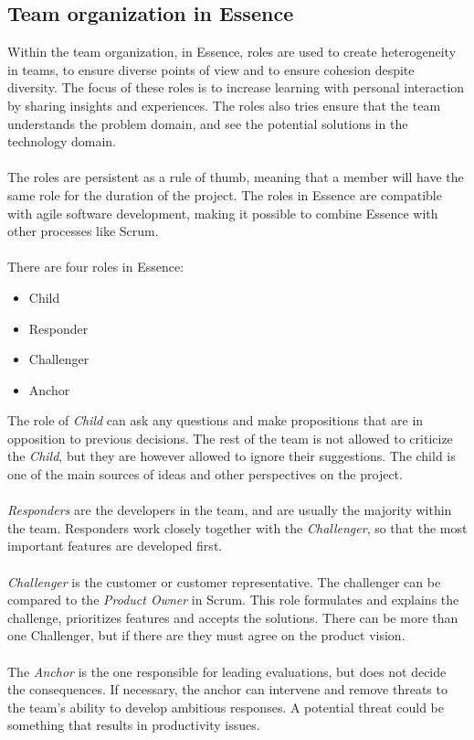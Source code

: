 \subsection{Team organization in Essence}
\label{sec:team-organization}
Within the team organization, in Essence, roles are used to create heterogeneity in teams, to ensure diverse points of view and to ensure cohesion despite diversity.
The focus of these roles is to increase learning with personal interaction by sharing insights and experiences.
The roles also tries ensure that the team understands the problem domain, and see the potential solutions in the technology domain.
\\\\
The roles are persistent as a rule of thumb, meaning that a member will have the same role for the duration of the project.
The roles in Essence are compatible with agile software development, making it possible to combine Essence with other processes like Scrum.
\\\\
There are four roles in Essence:
\begin{itemize}
    \item Child
    \item Responder
    \item Challenger
    \item Anchor
\end{itemize}
The role of \textit{Child} can ask any questions and make propositions that are in opposition to previous decisions.
The rest of the team is not allowed to criticize the \textit{Child}, but they are however allowed to ignore their suggestions.
The child is one of the main sources of ideas and other perspectives on the project.
\\\\
\textit{Responders} are the developers in the team, and are usually the majority within the team.
Responders work closely together with the \textit{Challenger}, so that the most important features are developed first.
\\\\
\textit{Challenger} is the customer or customer representative.
The challenger can be compared to the \textit{Product Owner} in Scrum.
This role formulates and explains the challenge, prioritizes features and accepts the solutions.
There can be more than one Challenger, but if there are they must agree on the product vision.
\\\\
The \textit{Anchor} is the one responsible for leading evaluations, but does not decide the consequences.
If necessary, the anchor can intervene and remove threats to the team's ability to develop ambitious responses.
A potential threat could be something that results in productivity issues.

